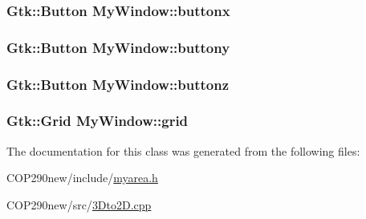 \subsubsection[{\texorpdfstring{buttonx}{buttonx}}]{\setlength{\rightskip}{0pt plus 5cm}Gtk\+::\+Button My\+Window\+::buttonx\hspace{0.3cm}{\ttfamily [protected]}}\hypertarget{class_my_window_aeeaad7113b758654a926a50229339910}{}\label{class_my_window_aeeaad7113b758654a926a50229339910}
\subsubsection[{\texorpdfstring{buttony}{buttony}}]{\setlength{\rightskip}{0pt plus 5cm}Gtk\+::\+Button My\+Window\+::buttony\hspace{0.3cm}{\ttfamily [protected]}}\hypertarget{class_my_window_abf7f5f0ba789dd4a23893169a0ef100c}{}\label{class_my_window_abf7f5f0ba789dd4a23893169a0ef100c}
\subsubsection[{\texorpdfstring{buttonz}{buttonz}}]{\setlength{\rightskip}{0pt plus 5cm}Gtk\+::\+Button My\+Window\+::buttonz\hspace{0.3cm}{\ttfamily [protected]}}\hypertarget{class_my_window_a5b82afccc869f5bd51d0482633684b60}{}\label{class_my_window_a5b82afccc869f5bd51d0482633684b60}
\subsubsection[{\texorpdfstring{grid}{grid}}]{\setlength{\rightskip}{0pt plus 5cm}Gtk\+::\+Grid My\+Window\+::grid\hspace{0.3cm}{\ttfamily [protected]}}\hypertarget{class_my_window_a1bd2ae9ce185432e826e238b61151af1}{}\label{class_my_window_a1bd2ae9ce185432e826e238b61151af1}


The documentation for this class was generated from the following files\+:\begin{DoxyCompactItemize}
\item 
C\+O\+P290new/include/\hyperlink{myarea_8h}{myarea.\+h}\item 
C\+O\+P290new/src/\hyperlink{3_dto2_d_8cpp}{3\+Dto2\+D.\+cpp}\end{DoxyCompactItemize}

